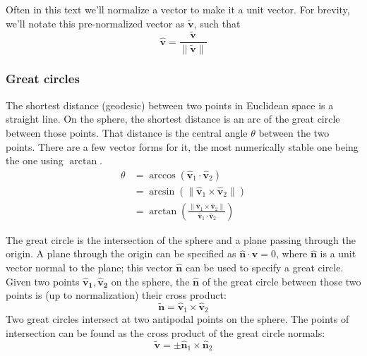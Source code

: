 \documentclass{amsart}[12pt]
\begin{document}
Often in this text we'll normalize a vector to make it a unit vector.
For brevity,
we'll notate this pre-normalized vector as $\mathbf{\widetilde{v}}$, such that
\begin{equation}
  \mathbf{\hat{v}} = \frac{\mathbf{\widetilde{v}}}{\|\mathbf{\widetilde{v}}\|}
\end{equation}

\subsubsection{Great circles}
The shortest distance (geodesic) between two points in Euclidean space is a
straight line. On the sphere, the shortest distance is an arc of the great
circle between those points. That distance is the central angle $\theta$
between the two points. There are a few vector forms for it, the most
numerically stable one being the one using $\arctan$.
\begin{equation}\begin{split}
\theta &= \arccos \left(\mathbf{\hat{v}}_1 \cdot \mathbf{\hat{v}}_2\right) \\
&= \arcsin \left(\|\mathbf{\hat{v}}_1 \times \mathbf{\hat{v}}_2\| \right) \\
&= \arctan \left( \frac{\|\mathbf{\hat{v}}_1 \times \mathbf{\hat{v}}_2\|}
  {\mathbf{\hat{v}}_1 \cdot \mathbf{\hat{v}}_2} \right)
\end{split}\end{equation}

The great circle is the intersection of the sphere
and a plane passing through the origin. A plane through the origin can be
specified as $\hat{\mathbf n} \cdot \mathbf v = 0$, where $\hat{\mathbf n}$ is
a unit vector normal to the plane; this vector $\hat{\mathbf n}$ can be used to
specify a great circle. Given two points $\mathbf{\hat{v}_1, \hat{v}_2}$ on the
sphere, the $\hat{\mathbf n}$ of the great circle between those two points is
(up to normalization) their cross product:
\begin{equation}
  \mathbf{\widetilde{n}} = \mathbf{\hat{v}}_1 \times \mathbf{\hat{v}}_2
\end{equation}
Two great circles intersect at two antipodal points on the sphere. The points
of intersection can be found as the cross product of the great circle normals:
\begin{equation}
  \mathbf{\widetilde{v}} = \pm \mathbf{\hat{n}}_1 \times \mathbf{\hat{n}}_2
\end{equation}
\end{document}

